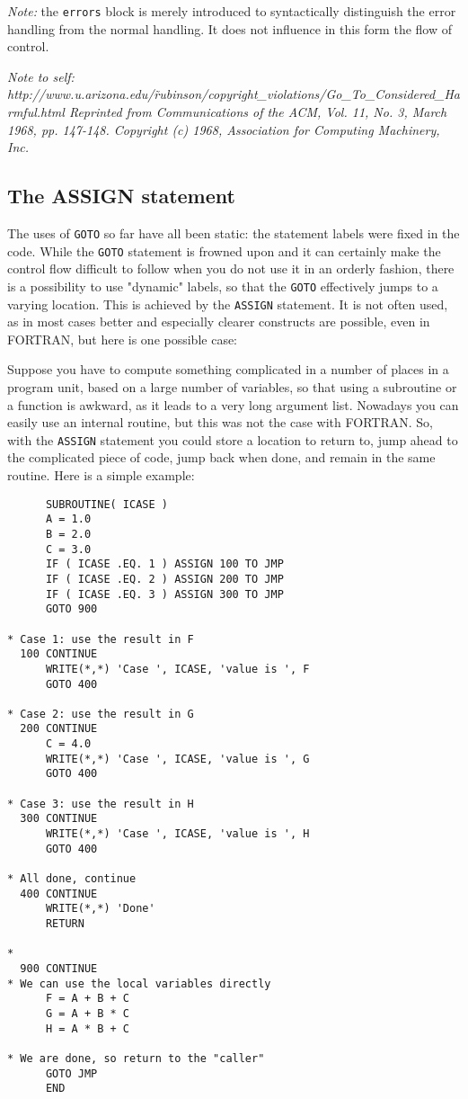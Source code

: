 \emph{Note:} the \verb+errors+ block is merely introduced to syntactically
distinguish the error handling from the normal handling. It does not influence
in this form the flow of control.


\emph{Note to self: http://www.u.arizona.edu/\~rubinson/copyright\_violations/Go\_To\_Considered\_Harmful.html
Reprinted from Communications of the ACM, Vol. 11, No. 3, March 1968, pp. 147-148. Copyright (c) 1968, Association for Computing Machinery, Inc.
}


\subsection{The ASSIGN statement}
The uses of \verb+GOTO+ so far have all been static: the statement labels were fixed
in the code. While the \verb+GOTO+ statement is frowned upon and it can certainly make
the control flow difficult to follow when you do not use it in an orderly fashion, there
is a possibility to use "dynamic" labels, so that the \verb+GOTO+ effectively jumps to
a varying location. This is achieved by the \verb+ASSIGN+ statement. It is not often
used, as in most cases better and especially clearer constructs are possible, even
in FORTRAN, but here is one possible case:

\noindent Suppose you have to compute something complicated in a number of places in a
program unit, based on a large number of variables, so that using a subroutine or
a function is awkward, as it leads to a very long argument list. Nowadays you
can easily use an internal routine, but this was not the case with FORTRAN.
So, with the \verb+ASSIGN+ statement you could store a location to return to,
jump ahead to the complicated piece of code, jump back when done, and remain in
the same routine. Here is a simple example:
%
\begin{verbatim}
      SUBROUTINE( ICASE )
      A = 1.0
      B = 2.0
      C = 3.0
      IF ( ICASE .EQ. 1 ) ASSIGN 100 TO JMP
      IF ( ICASE .EQ. 2 ) ASSIGN 200 TO JMP
      IF ( ICASE .EQ. 3 ) ASSIGN 300 TO JMP
      GOTO 900

* Case 1: use the result in F
  100 CONTINUE
      WRITE(*,*) 'Case ', ICASE, 'value is ', F
      GOTO 400

* Case 2: use the result in G
  200 CONTINUE
      C = 4.0
      WRITE(*,*) 'Case ', ICASE, 'value is ', G
      GOTO 400

* Case 3: use the result in H
  300 CONTINUE
      WRITE(*,*) 'Case ', ICASE, 'value is ', H
      GOTO 400

* All done, continue
  400 CONTINUE
      WRITE(*,*) 'Done'
      RETURN

*
  900 CONTINUE
* We can use the local variables directly
      F = A + B + C
      G = A + B * C
      H = A * B + C

* We are done, so return to the "caller"
      GOTO JMP
      END
\end{verbatim}

